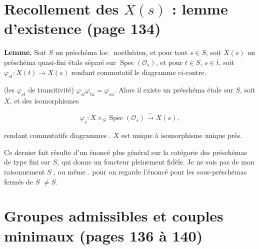 \documentclass[11pt,a4paper]{article}
\begin{document}
\section*{Recollement des $X(s)$ : lemme d'existence (page 134)}


\textbf{Lemme.} Soit $S$ un préschéma loc.\ noethérien, et pour tout $s \in S$,
soit \struck{\ill{}} $X(s)$ un préschéma quasi-fini étale séparé sur
$\operatorname{Spec}(\mathcal{O}_{s})$, et pour $t \in S$, $s \in \bar{t}$,
soit $\varphi_{st} : X(t) \to X(s)$ rendant commutatif le diagramme ci-contre.


(les $\varphi_{st}$ \ill{} de transitivité) $\varphi_{st}\varphi_{tu} =
\varphi_{su}$. Alors il existe un préschéma  étale sur
$S$, soit $X$, et des isomorphismes

\[ \varphi_{s} : X \times_{S} \operatorname{Spec}(\mathcal{O}_{s})
\xrightarrow{\;\sim\;} X(s), \]

rendant commutatifs  diagrammes \ill{}. $X$ est unique à isomorphisme
unique près.

Ce dernier fait résulte d'un énoncé plus général sur la catégorie des
préschémas de type fini sur $S$, qui donne un foncteur pleinement fidèle. Je ne
suis pas \ill{} de mon raisonnement \ill{} $S$ , ou même
. \ill{} pour \ill{} on regarde l'énoncé \ill{} pour les
sous-préschémas fermés de $S$ $\neq S$.



\section*{Groupes admissibles et couples minimaux (pages 136 à 140)}
\end{document}
